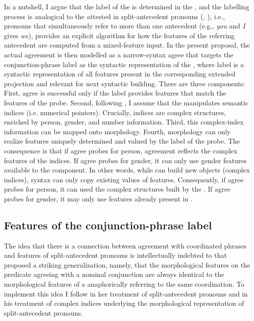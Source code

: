 \documentclass[output=paper,modfontsnewtxmath,hidelinks]{langscibook}
\begin{document}
In a nutshell, I argue that the label of the  is determined in the , and the labelling process is analogical to the  attested in split-antecedent pronouns (\citealt{Heim2008}, \citealt{Sudo2012}), i.e.,  pronouns that simultaneously refer to more than one antecedent (e.g., \textit{you} and \textit{I} gives \textit{we}), provides an explicit algorithm for how the features of the referring antecedent are computed from a mixed-feature input. In the present proposal, the actual agreement is then modelled as a narrow-syntax agree that targets the conjunction-phrase label as the syntactic representation of the , where label is a syntactic representation of all features present in the corresponding extended projection and relevant for next syntactic building. There are three components: First, agree is successful only if the label provides features that match the features of the probe. Second, following \citet{Sudo2012}, I assume that the  manipulates semantic indices (i.e. numerical pointers). Crucially, indices are complex structures, enriched by person, gender, and number information. Third,  this complex-index information can be mapped onto morphology. Fourth, morphology can only realize features uniquely determined and valued by the label of the probe. The consequence is that if agree probes for person, agreement reflects the complex features of the indices. If agree probes for gender, it can only use gender features available to the  component. In other words, while  can build new objects (complex indices), syntax can only copy existing values of features. Consequently, if agree probes for person, it can used the complex structures built by the . If agree probes for gender, it may only use features already present in .

\subsection{Features of the conjunction-phrase label}

The idea that there is a connection between agreement with coordinated  phrases and features of split-antecedent pronouns is intellectually indebted to \citet{Farkas1995} that proposed a striking generalization, namely, that the morphological features on the predicate agreeing with a nominal conjunction are always identical to the morphological features of a  anaphorically referring to the same coordination. To implement this idea I follow \citet{Heim2008} in her treatment of split-antecedent pronouns and \citet{Sudo2012} in his treatment of complex indices underlying the morphological representation of split-antecedent pronouns. 
\end{document}
